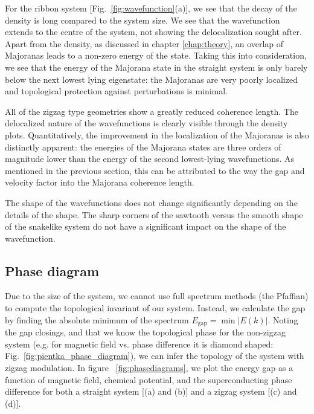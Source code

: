 			For the ribbon system [Fig.~\ref{fig:wavefunction}(a)], we see that the decay of the density is long compared to the system size.
			We see that the wavefunction extends to the centre of the system, not showing the delocalization sought after.
			Apart from the density, as discussed in chapter \ref{chap:theory}, an overlap of Majoranas leads to a non-zero energy of the state.
			Taking this into consideration, we see that the energy of the Majorana state in the straight system is only barely below the next lowest lying eigenstate: the Majoranas are very poorly localized and topological protection against perturbations is minimal.

			All of the zigzag type geometries show a greatly reduced coherence length.
			The delocalized nature of the wavefunctions is clearly visible through the density plots.
			Quantitatively, the improvement in the localization of the Majoranas is also distinctly apparent: the energies of the Majorana states are three orders of magnitude lower than the energy of the second lowest-lying wavefunctions.
			As mentioned in the previous section, this can be attributed to the way the gap and velocity factor into the Majorana coherence length.

			The shape of the wavefunctions does not change significantly depending on the details of the shape.
			The sharp corners of the sawtooth versus the smooth shape of the snakelike system do not have a significant impact on the shape of the wavefunction.


		\subsection{Phase diagram}

			Due to the size of the system, we cannot use full spectrum methods (the Pfaffian) to compute the topological invariant of our system.
			Instead, we calculate the gap by finding the absolute minimum of the spectrum $E_\textrm{gap}=\min{|E(k)|}$.
			Noting the gap closings, and that we know the topological phase for the non-zigzag system (e.g. for magnetic field vs. phase difference it is diamond shaped: Fig.~\ref{fig:pientka_phase_diagram}), we can infer the topology of the system with zigzag modulation.
			In figure ~\ref{fig:phasediagrams}, we plot the energy gap as a function of magnetic field, chemical potential, and the superconducting phase difference for both a straight system [(a) and (b)] and a zigzag system [(c) and (d)].

